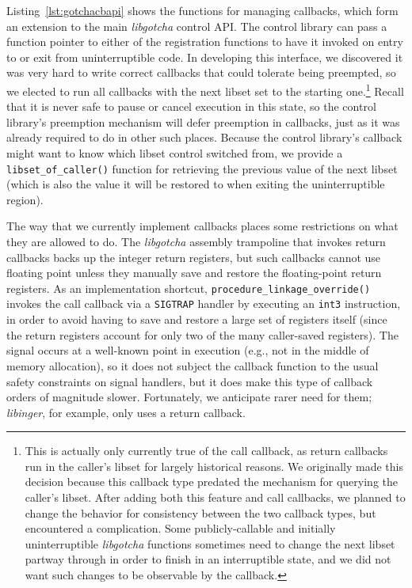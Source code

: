 Listing~\ref{lst:gotchacbapi} shows the functions for managing callbacks, which form
an extension to the main \textit{libgotcha} control API.  The control library can
pass a function pointer to either of the registration functions to have it invoked on
entry to or exit from uninterruptible code.  In developing this interface, we
discovered it was very hard to write correct callbacks that could tolerate being
preempted, so we elected to run all callbacks with the next libset set to the
starting one.\footnote{This is actually only currently true of the call callback, as
return callbacks run in the caller's libset for largely historical reasons.  We
originally made this decision because this callback type predated the mechanism for
querying the caller's libset.  After adding both this feature and call callbacks, we
planned to change the behavior for consistency between the two callback types, but
encountered a complication.  Some publicly-callable and initially uninterruptible
\textit{libgotcha} functions sometimes need to change the next libset partway through
in order to finish in an interruptible state, and we did not want such changes to be
observable by the callback.}
Recall that it is never safe to pause or cancel execution in this
state, so the control library's preemption mechanism will defer preemption in
callbacks, just as it was already required to do in other such places.  Because the
control library's callback might want to know which libset control switched from, we
provide a \texttt{libset\_of\_caller()} function for retrieving the previous value of
the next libset (which is also the value it will be restored to when exiting the
uninterruptible region).

\begin{sloppypar}
The way that we currently implement callbacks places some restrictions on what they
are allowed to do.  The \textit{libgotcha} assembly trampoline that invokes return
callbacks backs up the integer return registers, but such callbacks cannot use
floating point unless they manually save and restore the floating-point return
registers.  As an implementation shortcut, \texttt{procedure\_linkage\_override()}
invokes the call callback via a \texttt{SIGTRAP} handler by executing an
\texttt{int3} instruction, in order to avoid having to save and restore a large set
of registers itself (since the return registers account for only two of the many
caller-saved registers).  The signal occurs at a well-known point in execution (e.g.,
not in the middle of memory allocation), so it does not subject the callback function
to the usual safety constraints on signal handlers, but it does make this type of
callback orders of magnitude slower.  Fortunately, we anticipate rarer need for them;
\textit{libinger}, for example, only uses a return callback.
\end{sloppypar}


